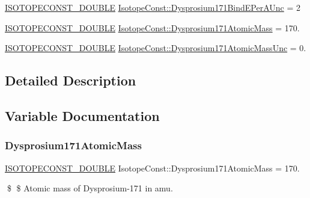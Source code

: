 \begin{DoxyCompactItemize}
\mbox{\hyperlink{group___isotope_const-_macros_ga8f45a7272ce02c0b4c65c44636ed719a}{I\+S\+O\+T\+O\+P\+E\+C\+O\+N\+S\+T\+\_\+\+D\+O\+U\+B\+LE}} \mbox{\hyperlink{group___isotope_const-_dysprosium-_dy171_ga0147dfbffca56d23539be454b1a2ec6a}{Isotope\+Const\+::\+Dysprosium171\+Bind\+E\+Per\+A\+Unc}} = 2
\item 
\mbox{\hyperlink{group___isotope_const-_macros_ga8f45a7272ce02c0b4c65c44636ed719a}{I\+S\+O\+T\+O\+P\+E\+C\+O\+N\+S\+T\+\_\+\+D\+O\+U\+B\+LE}} \mbox{\hyperlink{group___isotope_const-_dysprosium-_dy171_ga77b50a401652f3664af4377a627bf3d9}{Isotope\+Const\+::\+Dysprosium171\+Atomic\+Mass}} = 170.
\item 
\mbox{\hyperlink{group___isotope_const-_macros_ga8f45a7272ce02c0b4c65c44636ed719a}{I\+S\+O\+T\+O\+P\+E\+C\+O\+N\+S\+T\+\_\+\+D\+O\+U\+B\+LE}} \mbox{\hyperlink{group___isotope_const-_dysprosium-_dy171_ga564d2b1844fa86aeb6db3ea34f9855d2}{Isotope\+Const\+::\+Dysprosium171\+Atomic\+Mass\+Unc}} = 0.
\end{DoxyCompactItemize}


\subsection{Detailed Description}


\subsection{Variable Documentation}
\mbox{\label{group___isotope_const-_dysprosium-_dy171_ga77b50a401652f3664af4377a627bf3d9}} 
\subsubsection{\texorpdfstring{Dysprosium171\+Atomic\+Mass}{Dysprosium171AtomicMass}}
{\footnotesize\ttfamily \mbox{\hyperlink{group___isotope_const-_macros_ga8f45a7272ce02c0b4c65c44636ed719a}{I\+S\+O\+T\+O\+P\+E\+C\+O\+N\+S\+T\+\_\+\+D\+O\+U\+B\+LE}} Isotope\+Const\+::\+Dysprosium171\+Atomic\+Mass = 170.}

\$ \$ Atomic mass of Dysprosium-\/171 in amu. \mbox{\label{group___isotope_const-_dysprosium-_dy171_ga564d2b1844fa86aeb6db3ea34f9855d2}} 
